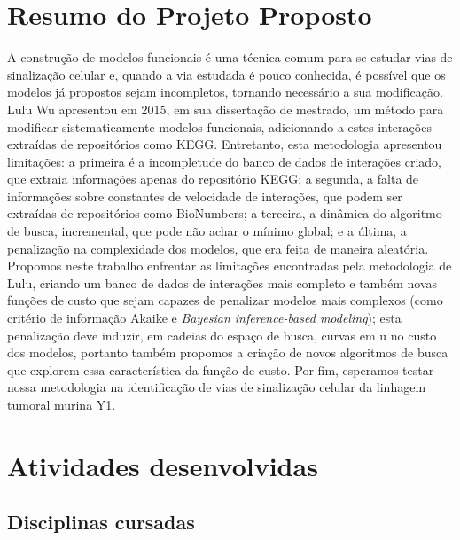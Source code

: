 \documentclass[12pt]{article}
\begin{document}
\section{Resumo do Projeto Proposto} \label{sec:resumo} %
A construção de modelos funcionais é uma técnica comum para se 
estudar vias de sinalização celular e, quando a via estudada é pouco
conhecida, é possível que os modelos já propostos sejam incompletos, 
tornando necessário a sua modificação.
Lulu Wu apresentou em 2015, em sua dissertação de mestrado, um método 
para  modificar sistematicamente modelos funcionais, adicionando a estes
interações extraídas de repositórios como KEGG. Entretanto, esta 
metodologia apresentou limitações: a primeira é a incompletude do banco 
de dados de interações criado, que extraia informações apenas do 
repositório KEGG; a segunda, a falta de informações sobre constantes 
de velocidade de interações, que podem ser extraídas de repositórios 
como BioNumbers; a terceira, a dinâmica do algoritmo de busca, 
incremental, que pode não achar o mínimo global; e a última, a 
penalização na complexidade dos modelos, que era feita de maneira 
aleatória. Propomos neste trabalho enfrentar as limitações encontradas
pela metodologia de Lulu, criando um banco de dados de interações mais
completo e também novas funções de custo que sejam capazes de 
penalizar modelos mais complexos (como critério de informação Akaike e 
{\em Bayesian inference-based modeling}); esta penalização deve induzir,
em cadeias do  espaço de busca, curvas em u no custo dos modelos, 
portanto também propomos a criação de novos algoritmos de busca que 
explorem essa característica da função de custo. Por fim, esperamos 
testar nossa metodologia na identificação de vias de sinalização celular 
da linhagem tumoral murina Y1.



\section{Atividades desenvolvidas}

\subsection{Disciplinas cursadas}
\end{document}
